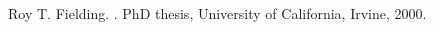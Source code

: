 \documentclass[11pt]{report}
\begin{document}

\begin{thebibliography}{9}

Roy T. Fielding.
.
\newblock PhD thesis, University of California, Irvine, 2000.

\end{thebibliography}
\end{document}
